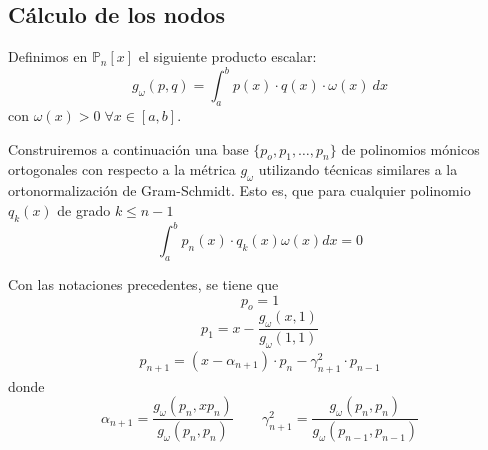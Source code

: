 \subsection{Cálculo de los nodos}
\begin{defin}
Definimos en $\mathbb{P}_n[x]$ el siguiente producto escalar:
$$g_{\omega}(p,q)=\int_a^b p(x) \cdot q(x)\cdot \omega(x) \: dx$$
 con $\omega(x)>0\;\forall x\in[a,b]$.
\end{defin}
\begin{obs}
Construiremos a continuación una base  $\{p_o,p_1,\ldots,p_n\}$ de polinomios mónicos ortogonales con respecto a la métrica $g_{\omega}$ utilizando técnicas similares a la ortonormalización de Gram-Schmidt. Esto es, que para cualquier polinomio $q_k(x)$ de grado $k\leq n-1$ 
$$\int_a^bp_n(x)\cdot q_k(x)\omega(x)dx=0$$
\end{obs}
\begin{prop}
Con las notaciones precedentes, se tiene que
$$p_o=1$$
$$p_1=x-\dfrac{g_{\omega}(x,1)}{g_{\omega}(1,1)}$$
\begin{align}
 p_{n+1}=\left(x-\alpha_{n+1}\right)\cdot p_n- \gamma_{n+1}^2\cdot p_{n-1}
 \label{pol:gauss}
\end{align}
donde
$$\alpha_{n+1}=\dfrac{g_{\omega}(p_n,xp_n)}{g_{\omega}(p_{n},p_{n})}\qquad \gamma_{n+1}^2=\dfrac{g_{\omega}(p_n,p_n)}{g_{\omega}(p_{n-1},p_{n-1})}$$
\end{prop}
